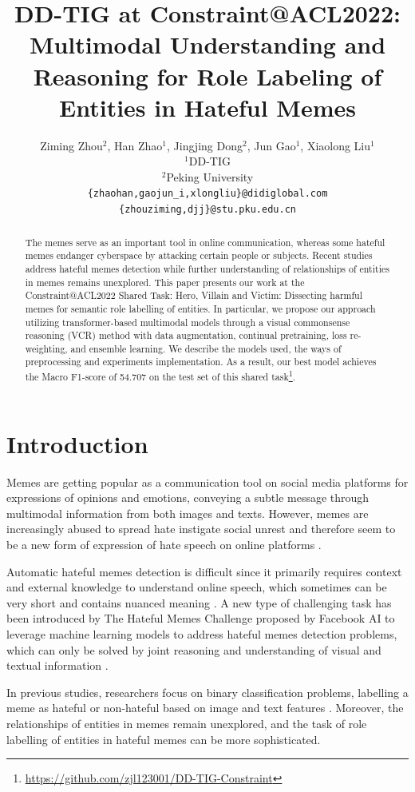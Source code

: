 \documentclass[11pt]{article}
\title{DD-TIG at Constraint@ACL2022: Multimodal Understanding and Reasoning for Role Labeling of Entities in Hateful Memes}
\author{Ziming Zhou$^2$, Han Zhao$^1$, Jingjing Dong$^2$, Jun Gao$^1$, Xiaolong Liu$^1$\\
 $^1$DD-TIG\\
$^2$Peking University\\
\texttt{\{zhaohan,gaojun\_i,xlongliu\}@didiglobal.com} \\
\texttt{\{zhouziming,djj\}@stu.pku.edu.cn} \\
}
\begin{document}
\maketitle
\begin{abstract}
The memes serve as an important tool in online communication, whereas some hateful memes endanger cyberspace by attacking certain people or subjects. Recent studies address hateful memes detection while further understanding of relationships of entities in memes remains unexplored. This paper presents our work at the Constraint@ACL2022 Shared Task: Hero, Villain and Victim: Dissecting harmful memes for semantic role labelling of entities. In particular, we propose our approach utilizing transformer-based multimodal models through a visual commonsense reasoning (VCR) method with data augmentation, continual pretraining, loss re-weighting, and ensemble learning. We describe the models used, the ways of preprocessing and experiments implementation. As a result, our best model achieves the Macro F1-score of 54.707 on the test set of this shared task\footnote{\url{https://github.com/zjl123001/DD-TIG-Constraint}}. 
\end{abstract}

\section{Introduction}

Memes are getting popular as a communication tool on social media platforms for expressions of opinions and emotions, conveying a subtle message through multimodal information from both images and texts. However, memes are increasingly abused to spread hate instigate social unrest and therefore seem to be a new form of expression of hate speech on online platforms \citep{bhattacharya2019social}.

Automatic hateful memes detection is difficult since it primarily requires context and external knowledge to understand online speech, which sometimes can be very short and contains nuanced meaning \citep{pramanick2021detecting}. A new type of challenging task has been introduced by The Hateful Memes Challenge \citep{kiela2020hateful} proposed by Facebook AI to leverage machine learning models to address hateful memes detection problems, which can only be solved by joint reasoning and understanding of visual and textual information \citep{zhu2020enhance}. 

In previous studies, researchers focus on binary classification problems, labelling a meme as hateful or non-hateful based on image and text features \citep{afridi2020multimodal}. Moreover, the relationships of entities in memes remain unexplored, and the task of role labelling of entities in hateful memes can be more sophisticated.
\end{document}
